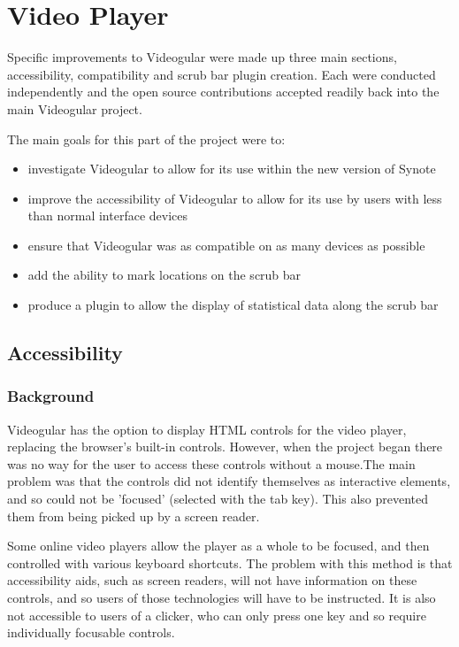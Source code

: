 \chapter{Video Player} 
\label{Chapter:Video Player}

Specific improvements to Videogular were made up three main sections, accessibility, compatibility and scrub bar plugin creation. Each were conducted independently and the open source contributions accepted readily back into the main Videogular project.

The main goals for this part of the project were to:
\begin{itemize}
\item investigate Videogular to allow for its use within the new version of Synote
\item improve the accessibility of Videogular to allow for its use by users with less than normal interface  devices
\item ensure that Videogular was as compatible on as many devices as possible
\item add the ability to mark locations on the scrub bar
\item produce a plugin to allow the display of statistical data along the scrub bar
\end{itemize}


\section{Accessibility} 
\label{Section:Accessibility}

\subsection{Background} 
Videogular has the option to display HTML controls for the video player, replacing the browser's built-in controls. However, when the project began there was no way for the user to access these controls without a mouse.The main problem was that the controls did not identify themselves as interactive elements, and so could not be 'focused' (selected with the tab key). This also prevented them from being picked up by a screen reader.

Some online video players allow the player as a whole to be focused, and then controlled with various keyboard shortcuts. The problem with this method is that accessibility aids, such as screen readers, will not have information on these controls, and so users of those technologies will have to be instructed. It is also not accessible to users of a clicker, who can only press one key and so require individually focusable controls.

